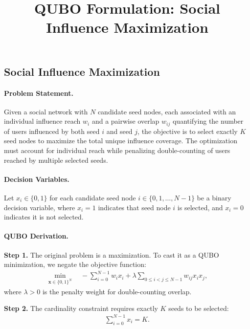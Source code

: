 \documentclass[12pt]{article}
\title{QUBO Formulation: Social Influence Maximization}
\date{}
\begin{document}
\maketitle

\subsection*{Social Influence Maximization}

\paragraph{Problem Statement.}
Given a social network with $N$ candidate seed nodes, each associated with an individual influence reach $w_i$ and a pairwise overlap $w_{ij}$ quantifying the number of users influenced by both seed $i$ and seed $j$, the objective is to select exactly $K$ seed nodes to maximize the total unique influence coverage. The optimization must account for individual reach while penalizing double-counting of users reached by multiple selected seeds.

\paragraph{Decision Variables.}
Let $x_i \in \{0,1\}$ for each candidate seed node $i \in \{0, 1, \dots, N-1\}$ be a binary decision variable, where $x_i = 1$ indicates that seed node $i$ is selected, and $x_i = 0$ indicates it is not selected.

\paragraph{QUBO Derivation.}
\textbf{Step 1.} The original problem is a maximization. To cast it as a QUBO minimization, we negate the objective function:
\begin{align}
\min_{\mathbf{x} \in \{0,1\}^N} \quad -\sum_{i=0}^{N-1} w_i x_i + \lambda \sum_{0 \le i < j \le N-1} w_{ij} x_i x_j,
\end{align}
where $\lambda > 0$ is the penalty weight for double-counting overlap.

\textbf{Step 2.} The cardinality constraint requires exactly $K$ seeds to be selected:
\begin{align}
\sum_{i=0}^{N-1} x_i = K.
\end{align}
\end{document}
